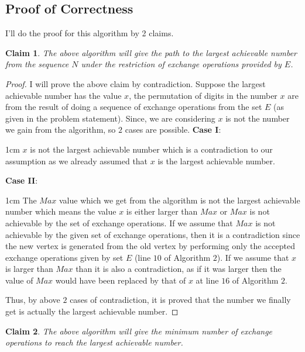 \documentclass{article}
\let\bold\textbf
\newtheorem{claim}{Claim}[section]
\newenvironment{myenv}{\begin{adjustwidth}{1cm}{}}{\end{adjustwidth}}
\begin{document}
{  \subsection{Proof of Correctness}{
    I'll do the proof for this algorithm by 2 claims.
    \begin{claim}
      The above algorithm will give the path to the largest achievable number from the sequence $N$ under the restriction of exchange operations provided by $E$.
    \end{claim}
    \begin{proof}
      I will prove the above claim by contradiction.\newline
      Suppose the largest achievable number has the value $x$, the permutation of digits in the number $x$ are from the result of doing a sequence of exchange operations from the set $E$ (as given in the problem statement). \newline
      Since, we are considering $x$ is not the number we gain from the algorithm, so $2$ cases are possible. \newline
      \bold{Case I}:
      \begin{myenv}
        $x$ is not the largest achievable number which is a contradiction to our assumption as we already assumed that $x$ is the largest achievable number.
      \end{myenv}
      \bold{Case II}:
      \begin{myenv}
        The $Max$ value which we get from the algorithm is not the largest achievable number which means the value $x$ is either larger than $Max$ or $Max$ is not achievable by the set of exchange operations.\newline
        If we assume that $Max$ is not achievable by the given set of exchange operations, then it is a contradiction since the new vertex is generated from the old vertex by performing only the accepted exchange operations given by set $E$ (line $10$ of Algorithm $2$). \newline
        If we assume that $x$ is larger than $Max$ than it is also a contradiction, as if it was larger then the value of $Max$ would have been replaced by that of $x$ at line $16$ of Algorithm $2$.
      \end{myenv}
      Thus, by above $2$ cases of contradiction, it is proved that the number we finally get is actually the largest achievable number.
    \end{proof}
    \begin{claim}
      The above algorithm will give the minimum number of exchange operations to reach the largest achievable number.

\end{claim}}}
\end{document}
